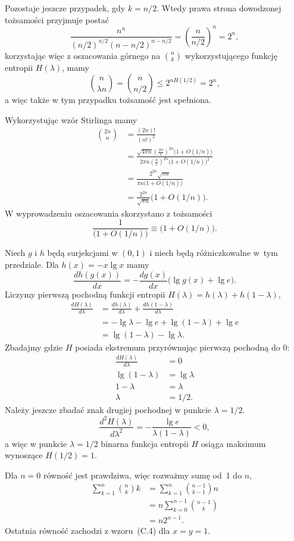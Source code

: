 Pozostaje jeszcze przypadek, gdy $k=n/2$. Wtedy prawa strona dowodzonej tożsamości przyjmuje postać
\[
	\frac{n^n}{(n/2)^{n/2}(n-n/2)^{n-n/2}} = \left(\frac{n}{n/2}\right)^n = 2^n,
\]
korzystając więc z oszacowania górnego na $\binom{n}{k}$ wykorzystującego funkcję entropii $H(\lambda)$, mamy
\[
	\binom{n}{\lambda n} = \binom{n}{n/2} \le 2^{nH(1/2)} = 2^n,
\]
a więc także w tym przypadku tożsamość jest spełniona.

\exercise{} %
Wykorzystując wzór Stirlinga mamy
\begin{align*}
	\binom{2n}{n} &= \frac{(2n)!}{(n!)^2} \\
	&= \frac{\sqrt{4\pi n}\left(\frac{2n}{e}\right)^{2n}\bigl(1+O(1/n)\bigr)}{2\pi n\left(\frac{n}{e}\right)^{2n}\bigl(1+O(1/n)\bigr)^2} \\[1mm]
	&= \frac{2^{2n}\sqrt{\pi n}}{\pi n\bigl(1+O(1/n)\bigr)} \\[1mm]
	&= \frac{2^{2n}}{\sqrt{\pi n}}\bigl(1+O(1/n)\bigr).
\end{align*}
W wyprowadzeniu oszacowania skorzystano z tożsamości
\[
	\frac{1}{\bigl(1+O(1/n)\bigr)} \equiv \bigl(1+O(1/n)\bigr).
\]

\exercise{} %
Niech $g$ i $h$ będą surjekcjami w $(0,1)$ i niech będą różniczkowalne w~tym przedziale. Dla $h(x)=-x\lg x$ mamy
\[
	\frac{dh(g(x))}{dx} = -\frac{dg(x)}{dx}\bigl(\lg g(x)+\lg e\bigr).
\]
Liczymy pierwszą pochodną funkcji entropii $H(\lambda)=h(\lambda)+h(1-\lambda)$,
\begin{align*}
	\frac{dH(\lambda)}{d\lambda} &= \frac{dh(\lambda)}{d\lambda}+\frac{dh(1-\lambda)}{d\lambda} \\
	&= -\lg\lambda-\lg e+\lg(1-\lambda)+\lg e \\
	&= \lg(1-\lambda)-\lg\lambda.
\end{align*}
Zbadajmy gdzie $H$ posiada ekstremum przyrównując pierwszą pochodną do 0:
\begin{align*}
	\frac{dH(\lambda)}{d\lambda} &= 0 \\
	\lg(1-\lambda) &= \lg\lambda \\
	1-\lambda &= \lambda \\
	\lambda &= 1/2.
\end{align*}
Należy jeszcze zbadać znak drugiej pochodnej w punkcie $\lambda=1/2$.
\[
	\frac{d^2H(\lambda)}{d\lambda^2} = -\frac{\lg e}{\lambda(1-\lambda)} < 0,
\]
a więc w punkcie $\lambda=1/2$ binarna funkcja entropii $H$ osiąga maksimum wynoszące $H(1/2)=1$.

\exercise{} %
Dla $n=0$ równość jest prawdziwa, więc rozważmy sumę od~1 do $n$,
\begin{align*}
	\sum_{k=1}^n\binom{n}{k}k &= \sum_{k=1}^n\binom{n-1}{k-1}n \\
	&= n\sum_{k=0}^{n-1}\binom{n-1}{k} \\
	&= n2^{n-1}.
\end{align*}
Ostatnia równość zachodzi z wzoru~(C.4) dla $x=y=1$.

